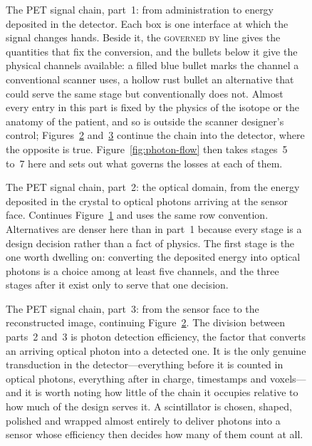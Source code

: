 \begin{figure}[p]
	\centering
	
	\caption[The PET signal chain, part 1: emission and transport]{%
		The PET signal chain, part~1: from administration to energy deposited in the detector.
		Each box is one interface at which the signal changes hands.
		Beside it, the \textsc{governed by} line gives the quantities that fix the conversion, and the bullets below it give the physical channels available: a filled blue bullet marks the channel a conventional scanner uses, a hollow rust bullet an alternative that could serve the same stage but conventionally does not.
		Almost every entry in this part is fixed by the physics of the isotope or the anatomy of the patient, and so is outside the scanner designer's control; Figures~\ref{fig:chain-optical} and~\ref{fig:chain-readout} continue the chain into the detector, where the opposite is true.
		Figure~\ref{fig:photon-flow} then takes stages~5 to~7 here and sets out what governs the losses at each of them.}
	\label{fig:chain-emission}
\end{figure}

\begin{figure}[p]
	\centering
	
	\caption[The PET signal chain, part 2: the optical domain]{%
		The PET signal chain, part~2: the optical domain, from the energy deposited in the crystal to optical photons arriving at the sensor face.
		Continues Figure~\ref{fig:chain-emission} and uses the same row convention.
		Alternatives are denser here than in part~1 because every stage is a design decision rather than a fact of physics.
		The first stage is the one worth dwelling on: converting the deposited energy into optical photons is a choice among at least five channels, and the three stages after it exist only to serve that one decision.}
	\label{fig:chain-optical}
\end{figure}

\begin{figure}[p]
	\centering
	
	\caption[The PET signal chain, part 3: readout and reconstruction]{%
		The PET signal chain, part~3: from the sensor face to the reconstructed image, continuing Figure~\ref{fig:chain-optical}.
		The division between parts~2 and~3 is photon detection efficiency, the factor that converts an arriving optical photon into a detected one.
		It is the only genuine transduction in the detector---everything before it is counted in optical photons, everything after in charge, timestamps and voxels---and it is worth noting how little of the chain it occupies relative to how much of the design serves it.
		A scintillator is chosen, shaped, polished and wrapped almost entirely to deliver photons into a sensor whose efficiency then decides how many of them count at all.}
	\label{fig:chain-readout}
\end{figure}

